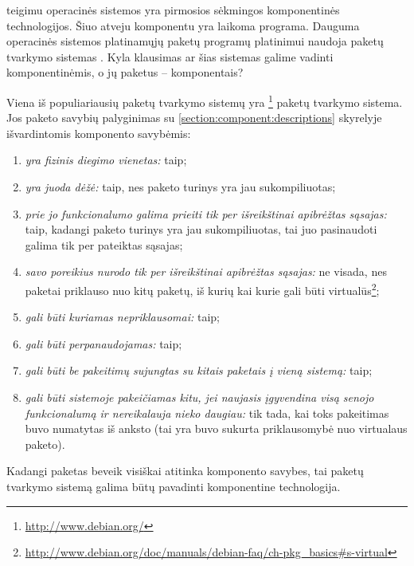 \cite[12]{cs-beyond-object-oriented-programming} teigimu operacinės
sistemos yra pirmosios sėkmingos komponentinės technologijos. Šiuo
atveju komponentu yra laikoma programa. Dauguma 
operacinės sistemos platinamųjų paketų  programų
platinimui naudoja paketų tvarkymo sistemas . Kyla klausimas ar šias sistemas galime vadinti komponentinėmis,
o jų paketus – komponentais?

Viena iš populiariausių paketų tvarkymo sistemų yra
\footnote{\url{http://www.debian.org/}} paketų
tvarkymo sistema. Jos paketo savybių palyginimas su
\ref{section:component:descriptions} skyrelyje išvardintomis
komponento savybėmis:
\begin{enumerate}
  \item \emph{yra fizinis diegimo vienetas:} taip;
  \item \emph{yra juoda dėžė:} taip, nes paketo turinys yra jau
    sukompiliuotas;
  \item \emph{prie jo funkcionalumo galima prieiti tik per
    išreikštinai apibrėžtas sąsajas:} taip, kadangi paketo turinys
    yra jau sukompiliuotas, tai juo pasinaudoti galima tik per
    pateiktas sąsajas;
  \item \emph{savo poreikius nurodo tik per išreikštinai apibrėžtas
    sąsajas:} ne visada, nes  paketai priklauso nuo
    kitų paketų, iš kurių kai kurie gali būti virtualūs\footnote{
    \url{http://www.debian.org/doc/manuals/debian-faq/ch-pkg_basics\#s-virtual}};
  \item \emph{gali būti kuriamas nepriklausomai:} taip;
  \item \emph{gali būti perpanaudojamas:} taip;
  \item \emph{gali būti be pakeitimų sujungtas su kitais paketais
    į vieną sistemą:} taip;
  \item \emph{gali būti sistemoje pakeičiamas kitu, jei naujasis
    įgyvendina visą senojo funkcionalumą ir nereikalauja nieko
    daugiau:} tik tada, kai toks pakeitimas buvo numatytas iš anksto
    (tai yra buvo sukurta priklausomybė nuo virtualaus paketo).
\end{enumerate}
Kadangi  paketas beveik visiškai atitinka komponento
savybes, tai  paketų tvarkymo sistemą galima
būtų pavadinti komponentine technologija.

